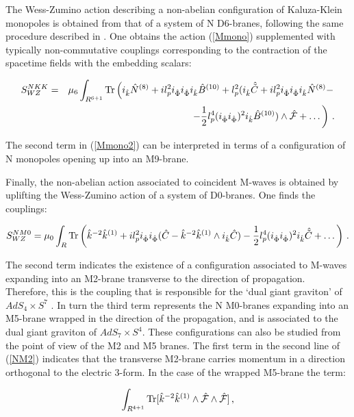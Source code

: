 \documentclass[12pt,a4paper]{article}
\begin{document}
The Wess-Zumino action describing a non-abelian configuration 
of Kaluza-Klein monopoles is obtained from that of a system of N 
D6-branes, following the same procedure described in \cite{BEL}.
One obtains the action (\ref{Mmono}) supplemented with typically
non-commutative
couplings corresponding to the contraction of the spacetime fields
with the embedding scalars:


\begin{eqnarray}
\label{Mmono2}
S^{NKK}_{WZ}&=&\mu_6 \int_{R^{6+1}}{\rm Tr}\left(i_{\hat k}{\hat N}^{(8)}
+il_p^2 i_{\hat \Phi}i_{\hat \Phi}i_{\hat k}{\hat B}^{(10)}
+l_p^2(i_{\hat k}{\hat {\tilde C}}+il_p^2 i_{\hat \Phi}
i_{\hat \Phi}i_{\hat k}{\hat N}^{(8)}-\right.\nonumber\\
&&\left. -\frac12 l_p^4 (i_{\hat \Phi}
i_{\hat \Phi})^2 i_{\hat k} {\hat B}^{(10)})\wedge {\hat {\cal F}}
+\dots\right)\, .
\end{eqnarray}

\noindent The second term in (\ref{Mmono2}) can be interpreted in
terms of a configuration of N monopoles opening up into an
M9-brane.

Finally, the non-abelian action associated to coincident M-waves
is obtained by uplifting the Wess-Zumino action of a system of
D0-branes. One finds the couplings:

\begin{equation}
S^{N M0}_{WZ}=\mu_0\int_R {\rm Tr}\left({\hat k}^{-2}{\hat k}^{(1)}
+il_p^2 i_{\hat \Phi}i_{\hat \Phi}({\hat C}-{\hat k}^{-2}{\hat k}^{(1)}
\wedge i_{\hat k}{\hat C})-\frac12 l_p^4 
(i_{\hat \Phi} i_{\hat \Phi})^2 i_{\hat k}{\hat {\tilde C}}
+\dots\right)\, .
\end{equation}

\noindent The second term indicates the existence of a configuration
associated to M-waves expanding into an M2-brane transverse to the 
direction of propagation. Therefore,
this is the coupling that is responsible for the `dual
giant graviton' of $AdS_4\times S^7$ \cite{GMT}.
In turn the third term represents the N M0-branes expanding into an
M5-brane wrapped in the direction of the propagation, and is associated
to the dual giant graviton of $AdS_7\times S^4$. 
These configurations can also be studied
from the point of view of the M2 and M5 branes. 
The first term in the
second line of (\ref{NM2}) indicates that the transverse M2-brane
carries momentum in a direction orthogonal to the electric 3-form.
In the case of the wrapped M5-brane the term:

\begin{equation}
\int_{R^{4+1}} {\rm Tr} [{\hat k}^{-2}{\hat k}^{(1)}\wedge {\hat {\cal F}}
\wedge {\hat {\cal F}}]\, ,
\end{equation}
\end{document}
